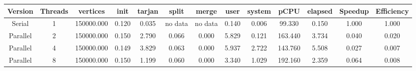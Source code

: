 \begin{tabular}{|c|c|c|c|c|c|c|c|c|c|c|c|c|}
\toprule
 Version &  Threads &   vertices &  init &  tarjan &   split &   merge &  user &  system &    pCPU &  elapsed &  Speedup &  Efficiency \\
\midrule
  Serial &        1 & 150000.000 & 0.120 &   0.035 & no data & no data & 0.140 &   0.006 &  99.330 &    0.150 &    1.000 &       1.000 \\
Parallel &        2 & 150000.000 & 0.150 &   2.790 &   0.066 &   0.000 & 5.829 &   0.121 & 163.440 &    3.734 &    0.040 &       0.020 \\
Parallel &        4 & 150000.000 & 0.149 &   3.829 &   0.063 &   0.000 & 5.937 &   2.722 & 143.760 &    5.508 &    0.027 &       0.007 \\
Parallel &        8 & 150000.000 & 0.150 &   1.199 &   0.060 &   0.000 & 3.340 &   1.029 & 192.160 &    2.359 &    0.064 &       0.008 \\
\bottomrule
\end{tabular}

